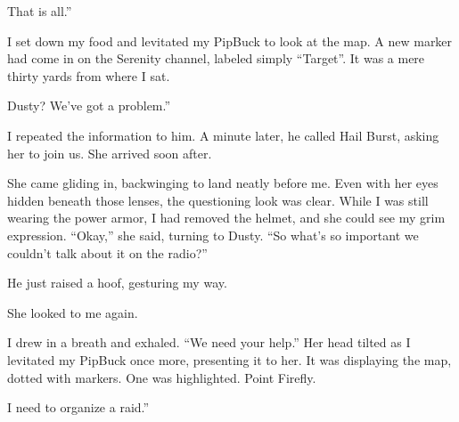 \leavevmode{}That is all.”

I set down my food and levitated my PipBuck to look at the map. A new marker had come in on the Serenity channel, labeled simply “Target”. It was a mere thirty yards from where I sat.

\leavevmode{}Dusty? We’ve got a problem.”

I repeated the information to him. A minute later, he called Hail Burst, asking her to join us. She arrived soon after.

She came gliding in, backwinging to land neatly before me. Even with her eyes hidden beneath those lenses, the questioning look was clear. While I was still wearing the power armor, I had removed the helmet, and she could see my grim expression. “Okay,” she said, turning to Dusty. “So what’s so important we couldn’t talk about it on the radio?”

He just raised a hoof, gesturing my way.

She looked to me again.

I drew in a breath and exhaled. “We need your help.” Her head tilted as I levitated my PipBuck once more, presenting it to her. It was displaying the map, dotted with markers. One was highlighted. Point Firefly.

\leavevmode{}I need to organize a raid.”
